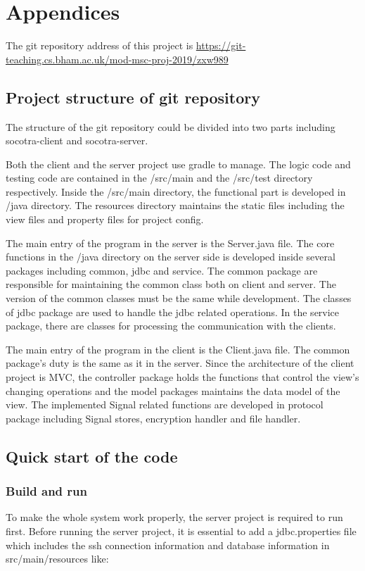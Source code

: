 \section{Appendices}
The git repository address of this project is \href{https://git-teaching.cs.bham.ac.uk/mod-msc-proj-2019/zxw989}{https://git-teaching.cs.bham.ac.uk/mod-msc-proj-2019/zxw989}
\subsection{Project structure of git repository}
The structure of the git repository could be divided into two parts including socotra-client and socotra-server.

Both the client and the server project use gradle to manage. The logic code and testing code are contained in the /src/main and the /src/test directory respectively. Inside the /src/main directory, the functional part is developed in /java directory. The resources directory maintains the static files including the view files and property files for project config.

The main entry of the program in the server is the Server.java file. The core functions in the /java directory on the server side is developed inside several packages including common, jdbc and service. The common package are responsible for maintaining the common class both on client and server. The version of the common classes must be the same while development. The classes of jdbc package are used to handle the jdbc related operations. In the service package, there are classes for processing the communication with the clients.

The main entry of the program in the client is the Client.java file. The common package's duty is the same as it in the server. Since the architecture of the client project is MVC, the controller package holds the functions that control the view's changing operations and the model packages maintains the data model of the view. The implemented Signal related functions are developed in protocol package including Signal stores, encryption handler and file handler.

\subsection{Quick start of the code}
\subsubsection{Build and run}
To make the whole system work properly, the server project is required to run first. Before running the server project, it is essential to add a jdbc.properties file which includes the ssh connection information and database information in src/main/resources like:

